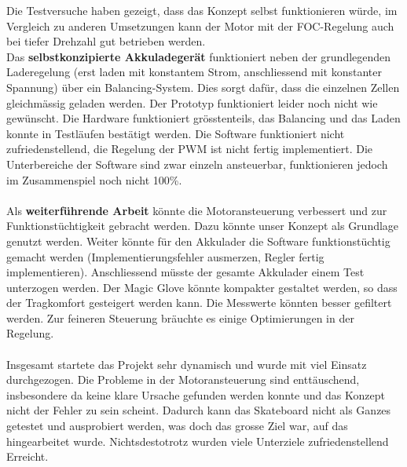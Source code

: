 Die Testversuche haben gezeigt, dass das Konzept selbst funktionieren würde, im Vergleich zu anderen Umsetzungen kann der Motor mit der FOC-Regelung auch bei tiefer Drehzahl gut betrieben werden. \\
Das \textbf{selbstkonzipierte Akkuladegerät} funktioniert neben der grundlegenden Laderegelung (erst laden mit konstantem Strom, anschliessend mit konstanter Spannung) über ein Balancing-System. Dies sorgt dafür, dass die einzelnen Zellen gleichmässig geladen werden. Der Prototyp funktioniert leider noch nicht wie gewünscht. Die Hardware funktioniert grösstenteils, das Balancing und das Laden konnte in Testläufen bestätigt werden. Die Software funktioniert nicht zufriedenstellend, die Regelung der PWM ist nicht fertig implementiert. Die Unterbereiche der Software sind zwar einzeln ansteuerbar, funktionieren jedoch im Zusammenspiel noch nicht 100\%. \\
\\
Als \textbf{weiterführende Arbeit} könnte die Motoransteuerung verbessert und zur Funktionstüchtigkeit gebracht werden. Dazu könnte unser Konzept als Grundlage genutzt werden. Weiter könnte für den Akkulader die Software funktionstüchtig gemacht werden (Implementierungsfehler ausmerzen, Regler fertig implementieren). Anschliessend müsste der gesamte Akkulader einem Test unterzogen werden.
Der Magic Glove könnte kompakter gestaltet werden, so dass der Tragkomfort gesteigert werden kann. Die Messwerte könnten besser gefiltert werden. Zur feineren Steuerung bräuchte es einige Optimierungen in der Regelung.\\
\\
Insgesamt startete das Projekt sehr dynamisch und wurde mit viel Einsatz durchgezogen. Die Probleme in der Motoransteuerung sind enttäuschend, insbesondere da keine klare Ursache gefunden werden konnte und das Konzept nicht der Fehler zu sein scheint. Dadurch kann das Skateboard nicht als Ganzes getestet und ausprobiert werden, was doch das grosse Ziel war, auf das hingearbeitet wurde. Nichtsdestotrotz wurden viele Unterziele zufriedenstellend Erreicht.